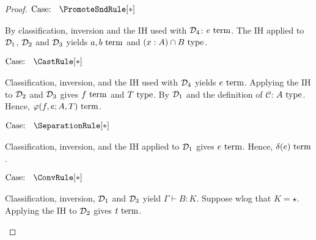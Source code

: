 \begin{proof}
    $\text{Case: }\begin{array}{c} \PromoteSndRule[*] \end{array}$
    \begin{proofcase}
        By classification, inversion and the IH used with $\mathcal{D}_{4}$: $e~\textnormal{term}$.
        The IH applied to $\mathcal{D}_{1}$, $\mathcal{D}_{2}$ and $\mathcal{D}_{3}$ yields $a, b~\textnormal{term}$ and $(x : A) \cap B~\textnormal{type}$.
    \end{proofcase}

    $\text{Case: }\begin{array}{c} \CastRule[*] \end{array}$
    \begin{proofcase}
        Classification, inversion, and the IH used with $\mathcal{D}_{4}$ yields $e~\textnormal{term}$.
        Applying the IH to $\mathcal{D}_{2}$ and $\mathcal{D}_{3}$ gives $f~\textnormal{term}$ and $T~\textnormal{type}$.
        By $\mathcal{D}_{1}$ and the definition of $\mathcal{C}$: $A~\textnormal{type}$.
        Hence, $\varphi(f, e; A, T)~\textnormal{term}$.
    \end{proofcase}

    $\text{Case: }\begin{array}{c} \SeparationRule[*] \end{array}$
    \begin{proofcase}
        Classification, inversion, and the IH applied to $\mathcal{D}_{1}$ gives $e~\textnormal{term}$.
        Hence, $\delta(e)~\textnormal{term}$.
    \end{proofcase}

    $\text{Case: }\begin{array}{c} \ConvRule[*] \end{array}$
    \begin{proofcase}
        Classification, inversion, $\mathcal{D}_{1}$ and $\mathcal{D}_{3}$ yield $\Gamma \vdash B : K$.
        Suppose wlog that $K = \star$.
        Applying the IH to $\mathcal{D}_{2}$ gives $t~\textnormal{term}$.
    \end{proofcase}
\end{proof}
